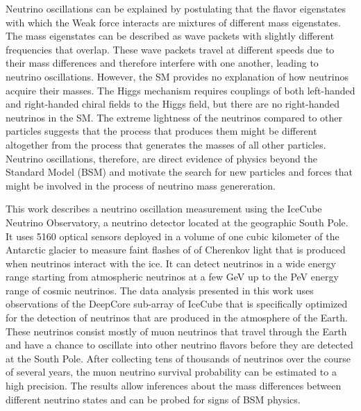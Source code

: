 Neutrino oscillations can be explained by postulating that the flavor eigenstates with which the Weak force interacts are mixtures of different mass eigenstates. The mass eigenstates can be described as wave packets with slightly different frequencies that overlap. These wave packets travel at different speeds due to their mass differences and therefore interfere with one another, leading to neutrino oscillations. However, the SM provides no explanation of how neutrinos acquire their masses. The Higgs mechanism requires couplings of both left-handed and right-handed chiral fields to the Higgs field, but there are no right-handed neutrinos in the SM. The extreme lightness of the neutrinos compared to other particles suggests that the process that produces them might be different altogether from the process that generates the masses of all other particles. Neutrino oscillations, therefore, are direct evidence of physics beyond the Standard Model (BSM) and motivate the search for new particles and forces that might be involved in the process of neutrino mass genereration.

This work describes a neutrino oscillation measurement using the IceCube Neutrino Observatory, a neutrino detector located at the geographic South Pole. It uses 5160 optical sensors deployed in a volume of one cubic kilometer of the Antarctic glacier to measure faint flashes of of Cherenkov light that is produced when neutrinos interact with the ice. It can detect neutrinos in a wide energy range starting from atmospheric neutrinos at a few GeV up to the PeV energy range of cosmic neutrinos. The data analysis presented in this work uses observations of the DeepCore sub-array of IceCube that is specifically optimized for the detection of neutrinos that are produced in the atmosphere of the Earth. These neutrinos consist mostly of muon neutrinos that travel through the Earth and have a chance to oscillate into other neutrino flavors before they are detected at the South Pole. After collecting tens of thousands of neutrinos over the course of several years, the muon neutrino survival probability can be estimated to a high precision. The results allow inferences about the mass differences between different neutrino states and can be probed for signs of BSM physics.


